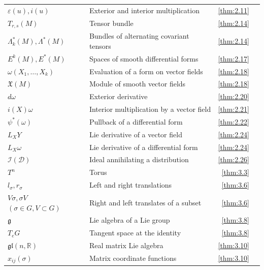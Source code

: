 {\begin{longtable}{@{}>{\raggedright\arraybackslash}p{.39\linewidth}>{\raggedright\arraybackslash}p{.39\linewidth}r r@{}}
$\varepsilon(u),\allowbreak  i(u)$ & Exterior and interior multiplication & \ref{thm:2.11} & \pageref{thm:2.11} \\
$T_{r,\allowbreak s}(M)$ & Tensor bundle & \ref{thm:2.14} & \pageref{thm:2.14} \\
$\Lambda_{k}^{*}(M),\allowbreak  \Lambda^{*}(M)$ & Bundles of alternating covariant tensors & \ref{thm:2.14} & \pageref{thm:2.14} \\
$E^k(M),\allowbreak E^*(M)$ & Spaces of smooth differential forms & \ref{thm:2.17} & \pageref{thm:2.17} \\
$\omega(X_{1},\allowbreak \ldots,\allowbreak X_{k})$ & Evaluation of a form on vector fields & \ref{thm:2.18} & \pageref{thm:2.18} \\
$\mathfrak{X}(M)$ & Module of smooth vector fields & \ref{thm:2.18} & \pageref{thm:2.18} \\
$d\omega$ & Exterior derivative & \ref{thm:2.20} & \pageref{thm:2.20} \\
$i(X)\omega$ & Interior multiplication by a vector field & \ref{thm:2.21} & \pageref{thm:2.21} \\
$\psi^{*}(\omega)$ & Pullback of a differential form & \ref{thm:2.22} & \pageref{thm:2.22} \\
$L_{X}Y$ & Lie derivative of a vector field & \ref{thm:2.24} & \pageref{thm:2.24} \\
$L_{X}\omega$ & Lie derivative of a differential form & \ref{thm:2.24} & \pageref{thm:2.24} \\
$\mathcal I(\mathcal D)$ & Ideal annihilating a distribution & \ref{thm:2.26} & \pageref{thm:2.26} \\
$T^{n}$ & Torus & \ref{thm:3.3} & \pageref{thm:3.3} \\
$l_\sigma,\allowbreak r_\sigma$ & Left and right translations & \ref{thm:3.6} & \pageref{thm:3.6} \\
$V\sigma,\allowbreak \sigma V$ $(\sigma\in G,\allowbreak V\subset G)$ & Right and left translates of a subset & \ref{thm:3.6} & \pageref{thm:3.6} \\
$\mathfrak g$ & Lie algebra of a Lie group & \ref{thm:3.8} & \pageref{thm:3.8} \\
$T_{e} G$ & Tangent space at the identity & \ref{thm:3.8} & \pageref{thm:3.8} \\
$\mathfrak{gl}(n,\allowbreak \mathbb R)$ & Real matrix Lie algebra & \ref{thm:3.10} & \pageref{thm:3.10} \\
$x_{ij}(\sigma)$ & Matrix coordinate functions & \ref{thm:3.10} & \pageref{thm:3.10} \\

\end{longtable}}
